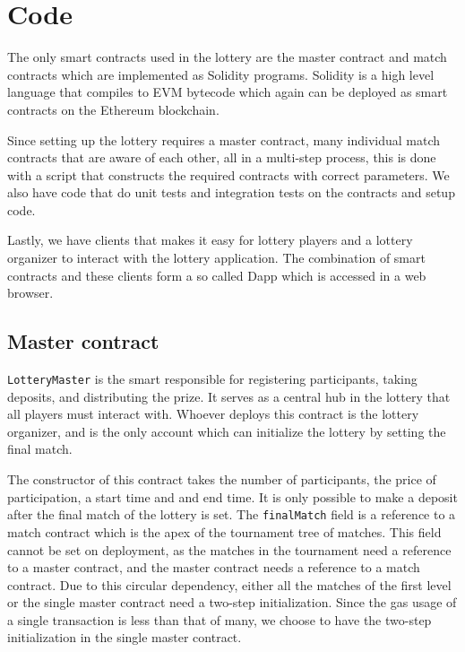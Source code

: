 \section{Code}
\label{sec:code}

The only smart contracts used in the lottery are the master contract and match contracts which are implemented as Solidity programs. Solidity is a high level language that compiles to EVM bytecode which again can be deployed as smart contracts on the Ethereum blockchain.

Since setting up the lottery requires a master contract, many individual match contracts that are aware of each other, all in a multi-step process, this is done with a script that constructs the required contracts with correct parameters. We also have code that do unit tests and integration tests on the contracts and setup code.

Lastly, we have clients that makes it easy for lottery players and a lottery organizer to interact with the lottery application. The combination of smart contracts and these clients form a so called Dapp which is accessed in a web browser.

\subsection{Master contract}
\texttt{LotteryMaster} is the smart responsible for registering participants, taking deposits, and distributing the prize. It serves as a central hub in the lottery that all players must interact with. Whoever deploys this contract is the lottery organizer, and is the only account which can initialize the lottery by setting the final match. 

The constructor of this contract takes the number of participants, the price of participation, a start time and and end time. It is only possible to make a deposit after the final match of the lottery is set. The \texttt{finalMatch} field is a reference to a match contract which is the apex of the tournament tree of matches. This field cannot be set on deployment, as the matches in the tournament need a reference to a master contract, and the master contract needs a reference to a match contract. Due to this circular dependency, either all the matches of the first level or the single master contract need a two-step initialization. Since the gas usage of a single transaction is less than that of many, we choose to have the two-step initialization in the single master contract.

